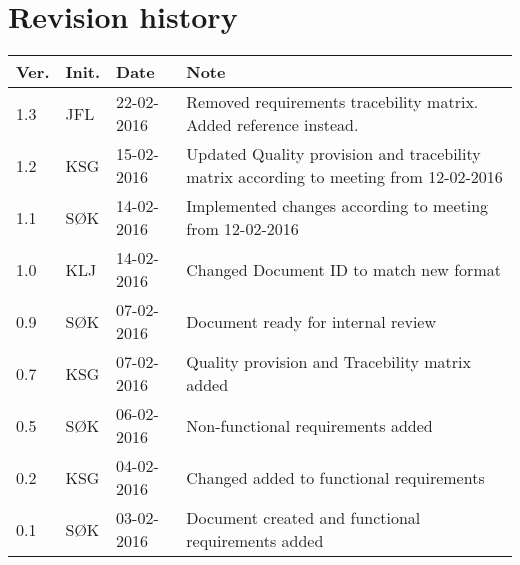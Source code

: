 \label{chp_revisionHistory}
\chapter*{Revision history}

\begin{tabular}{b{1cm} b{1cm} b{2cm} b{8cm}}
    \textbf{Ver.} & \textbf{Init.} & \textbf{Date} & \textbf{Note} \\
    \hline
    1.3 & JFL & 22-02-2016 & Removed requirements tracebility matrix. Added reference instead. \\
    1.2 & KSG & 15-02-2016 & Updated Quality provision and tracebility matrix according to meeting from 12-02-2016 \\
    1.1 & SØK & 14-02-2016 & Implemented changes according to meeting from 12-02-2016 \\ 
    1.0 & KLJ & 14-02-2016 & Changed Document ID to match new format \\
    0.9 & SØK & 07-02-2016 & Document ready for internal review \\
    0.7 & KSG & 07-02-2016 & Quality provision and Tracebility matrix added \\
    0.5 & SØK & 06-02-2016 & Non-functional requirements added \\
	0.2 & KSG & 04-02-2016 & Changed added to functional requirements \\
    0.1 & SØK  & 03-02-2016 & Document created and functional requirements added  \\
\end{tabular}